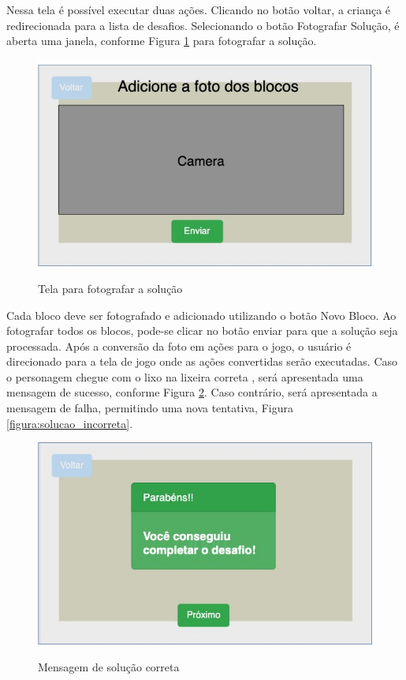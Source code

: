     Nessa tela é possível executar duas ações. Clicando no botão voltar, a criança é redirecionada para a lista de desafios. Selecionando o botão Fotografar Solução, é aberta uma janela, conforme Figura \ref{figura:fotografar_blocos} para fotografar a solução.
    
    \begin{figure}[H]
        \caption{Tela para fotografar a solução}
        \centering
        \includegraphics[width=\linewidth]{Imagens/Cap3/UploadSolucao.jpg}
        \label{figura:fotografar_blocos}
    \end{figure}
    
    Cada bloco deve ser fotografado e adicionado utilizando o botão Novo Bloco.
    Ao fotografar todos os blocos, pode-se clicar no botão enviar para que a solução seja processada.
    Após a conversão da foto em ações para o jogo, o usuário é direcionado para a tela de jogo onde as ações convertidas serão executadas.
    Caso o personagem chegue com o lixo na lixeira correta , será apresentada uma mensagem de sucesso, conforme Figura \ref{figura:solucao_correta}. Caso contrário, será apresentada a mensagem de falha, permitindo uma nova tentativa, Figura \ref{figura:solucao_incorreta}.
    
    \begin{figure}[H]
        \caption{Mensagem de solução correta}
        \centering
        \includegraphics[width=\linewidth]{Imagens/Cap3/solucao_correta.jpg}
        \label{figura:solucao_correta}
    \end{figure}
    

